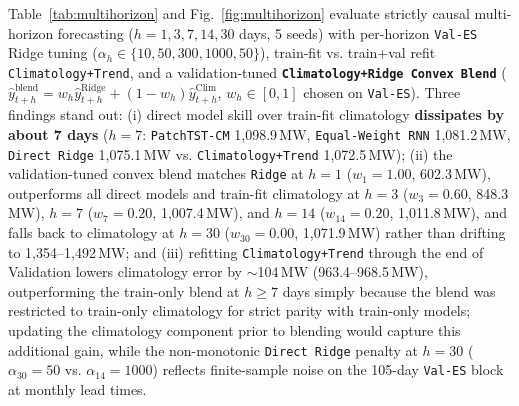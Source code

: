 \documentclass[5p,twocolumn,authoryear]{elsarticle}
\begin{document}
Table~\ref{tab:multihorizon} and Fig.~\ref{fig:multihorizon} evaluate strictly causal multi-horizon forecasting ($h = 1, 3, 7, 14, 30$ days, 5 seeds) with per-horizon \texttt{Val-ES} Ridge tuning ($\alpha_h \in \{10, 50, 300, 1000, 50\}$), train-fit vs. train+val refit \texttt{Climatology+Trend}, and a validation-tuned \textbf{\texttt{Climatology+Ridge Convex Blend}} ($\hat{y}^{\text{blend}}_{t+h} = w_h \hat{y}^{\text{Ridge}}_{t+h} + (1 - w_h)\hat{y}^{\text{Clim}}_{t+h}$, $w_h \in [0, 1]$ chosen on \texttt{Val-ES}). Three findings stand out: (i) direct model skill over train-fit climatology \textbf{dissipates by about 7 days} ($h=7$: \texttt{PatchTST-CM} 1,098.9\,MW, \texttt{Equal-Weight RNN} 1,081.2\,MW, \texttt{Direct Ridge} 1,075.1\,MW vs. \texttt{Climatology+Trend} 1,072.5\,MW); (ii) the validation-tuned convex blend matches \texttt{Ridge} at $h=1$ ($w_1=1.00$, 602.3\,MW), outperforms all direct models and train-fit climatology at $h=3$ ($w_3=0.60$, 848.3\,MW), $h=7$ ($w_7=0.20$, 1,007.4\,MW), and $h=14$ ($w_{14}=0.20$, 1,011.8\,MW), and falls back to climatology at $h=30$ ($w_{30}=0.00$, 1,071.9\,MW) rather than drifting to 1,354--1,492\,MW; and (iii) refitting \texttt{Climatology+Trend} through the end of Validation lowers climatology error by $\sim$104\,MW (963.4--968.5\,MW), outperforming the train-only blend at $h \ge 7$ days simply because the blend was restricted to train-only climatology for strict parity with train-only models; updating the climatology component prior to blending would capture this additional gain, while the non-monotonic \texttt{Direct Ridge} penalty at $h=30$ ($\alpha_{30}=50$ vs. $\alpha_{14}=1000$) reflects finite-sample noise on the 105-day \texttt{Val-ES} block at monthly lead times.
\end{document}
